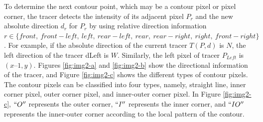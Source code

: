 
To determine the next contour point, which may be a contour pixel or pixel corner, the tracer detects the intensity of its adjacent pixel $P_r$ and the new absolute direction $d_r$ for $P_r$ by using relative direction information $r\in\{front,\ front-left,\ left,\ rear-left,\ rear,\ rear-right,\ right,\ front-right\}$. For example, if the absolute direction of the current tracer $T(P, d)$ is $N$, the left direction of the tracer dLeft is $W$. Similarly, the left pixel of tracer $P_{Left}$ is $(x – 1, y)$. Figures \ref{fig:img2-a} and \ref{fig:img2-b} show the directional information of the tracer, and Figure \ref{fig:img2-c} shows the different types of contour pixels. The contour pixels can be classified into four types, namely, straight line, inner corner pixel, outer corner pixel, and inner-outer corner pixel. In Figure \ref{fig:img2-c}, $``O''$ represents the outer corner, $``I''$ represents the inner corner, and $``IO''$ represents the inner-outer corner according to the local pattern of the contour.


